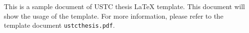 ﻿\begin{abstract}
本文档是中国科学技术大学学位论文 \LaTeX{} 模板的一个示例文档. 这里会给出模板使用方法的简介. 模板选项及详细用法请参考说明文档 \verb|ustcthesis.pdf|.


\end{abstract}

\begin{enabstract}

This is a sample document of USTC thesis \LaTeX{} template. This document will show the usage of the template. For more information, please refer to the template document \verb|ustcthesis.pdf|.


\end{enabstract}
